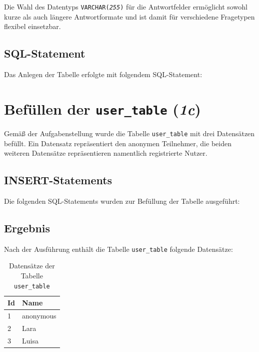 Die Wahl des Datentyps \texttt{VARCHAR(\textit{255})} für die Antwortfelder ermöglicht sowohl kurze als auch längere Antwortformate und ist damit für verschiedene Fragetypen flexibel einsetzbar.

\subsection{\acs{SQL}-Statement}

Das Anlegen der Tabelle erfolgte mit folgendem \acs{SQL}-Statement:




\section{Befüllen der \texttt{user\_table} (\textit{1c})}

Gemäß der Aufgabenstellung wurde die Tabelle \texttt{user\_table} mit drei Datensätzen befüllt. Ein Datensatz repräsentiert den anonymen Teilnehmer, die beiden weiteren Datensätze repräsentieren namentlich registrierte Nutzer.

\subsection{INSERT-Statements}

Die folgenden \acs{SQL}-Statements wurden zur Befüllung der Tabelle ausgeführt:



\subsection{Ergebnis}

Nach der Ausführung enthält die Tabelle \texttt{user\_table} folgende Datensätze:

\begin{table}[h]
\centering
\begin{tabular}{|l|l|}
\hline
\textbf{Id} & \textbf{Name} \\
\hline
1 & anonymous \\
2 & Lara \\
3 & Luisa \\
\hline
\end{tabular}
\caption{Datensätze der Tabelle \texttt{user\_table}}
\label{tab:user_data}
\end{table}

